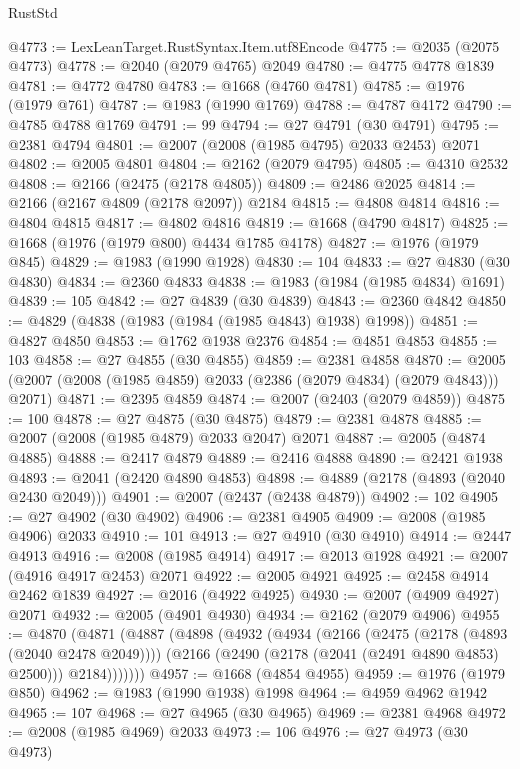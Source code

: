 \begin{lexlean}{RustStd}
\begin{coremodule}
@4773 := LexLeanTarget.RustSyntax.Item.utf8Encode
@4775 := @2035 (@2075 @4773)
@4778 := @2040 (@2079 @4765) @2049
@4780 := @4775 @4778 @1839
@4781 := @4772 @4780
@4783 := @1668 (@4760 @4781)
@4785 := @1976 (@1979 @761)
@4787 := @1983 (@1990 @1769)
@4788 := @4787 @4172
@4790 := @4785 @4788 @1769
@4791 := 99
@4794 := @27 @4791 (@30 @4791)
@4795 := @2381 @4794
@4801 := @2007 (@2008 (@1985 @4795) @2033 @2453) @2071
@4802 := @2005 @4801
@4804 := @2162 (@2079 @4795)
@4805 := @4310 @2532
@4808 := @2166 (@2475 (@2178 @4805))
@4809 := @2486 @2025
@4814 := @2166 (@2167 @4809 (@2178 @2097)) @2184
@4815 := @4808 @4814
@4816 := @4804 @4815
@4817 := @4802 @4816
@4819 := @1668 (@4790 @4817)
@4825 := @1668 (@1976 (@1979 @800) @4434 @1785 @4178)
@4827 := @1976 (@1979 @845)
@4829 := @1983 (@1990 @1928)
@4830 := 104
@4833 := @27 @4830 (@30 @4830)
@4834 := @2360 @4833
@4838 := @1983 (@1984 (@1985 @4834) @1691)
@4839 := 105
@4842 := @27 @4839 (@30 @4839)
@4843 := @2360 @4842
@4850 := @4829 (@4838 (@1983 (@1984 (@1985 @4843) @1938) @1998))
@4851 := @4827 @4850
@4853 := @1762 @1938 @2376
@4854 := @4851 @4853
@4855 := 103
@4858 := @27 @4855 (@30 @4855)
@4859 := @2381 @4858
@4870 := @2005 (@2007 (@2008 (@1985 @4859) @2033 (@2386 (@2079 @4834) (@2079 @4843))) @2071)
@4871 := @2395 @4859
@4874 := @2007 (@2403 (@2079 @4859))
@4875 := 100
@4878 := @27 @4875 (@30 @4875)
@4879 := @2381 @4878
@4885 := @2007 (@2008 (@1985 @4879) @2033 @2047) @2071
@4887 := @2005 (@4874 @4885)
@4888 := @2417 @4879
@4889 := @2416 @4888
@4890 := @2421 @1938
@4893 := @2041 (@2420 @4890 @4853)
@4898 := @4889 (@2178 (@4893 (@2040 @2430 @2049)))
@4901 := @2007 (@2437 (@2438 @4879))
@4902 := 102
@4905 := @27 @4902 (@30 @4902)
@4906 := @2381 @4905
@4909 := @2008 (@1985 @4906) @2033
@4910 := 101
@4913 := @27 @4910 (@30 @4910)
@4914 := @2447 @4913
@4916 := @2008 (@1985 @4914)
@4917 := @2013 @1928
@4921 := @2007 (@4916 @4917 @2453) @2071
@4922 := @2005 @4921
@4925 := @2458 @4914 @2462 @1839
@4927 := @2016 (@4922 @4925)
@4930 := @2007 (@4909 @4927) @2071
@4932 := @2005 (@4901 @4930)
@4934 := @2162 (@2079 @4906)
@4955 := @4870
    (@4871
      (@4887
        (@4898
          (@4932
            (@4934
              (@2166
                (@2475 (@2178 (@4893 (@2040 @2478 @2049))))
                (@2166 (@2490 (@2178 (@2041 (@2491 @4890 @4853) @2500))) @2184)))))))
@4957 := @1668 (@4854 @4955)
@4959 := @1976 (@1979 @850)
@4962 := @1983 (@1990 @1938) @1998
@4964 := @4959 @4962 @1942
@4965 := 107
@4968 := @27 @4965 (@30 @4965)
@4969 := @2381 @4968
@4972 := @2008 (@1985 @4969) @2033
@4973 := 106
@4976 := @27 @4973 (@30 @4973)

\end{coremodule}
\end{lexlean}
